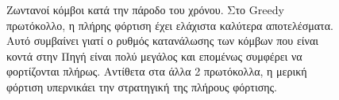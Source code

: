 \begin{figure}[H]
  \centering
  \caption{Ζωντανοί κόμβοι κατά την πάροδο του χρόνου. Στο Greedy πρωτόκολλο, η πλήρης φόρτιση έχει ελάχιστα καλύτερα αποτελέσματα. Αυτό συμβαίνει γιατί ο ρυθμός
κατανάλωσης των κόμβων που είναι κοντά στην Πηγή είναι πολύ μεγάλος και επομένως συμφέρει να φορτίζονται πλήρως. Αντίθετα στα άλλα 2 πρωτόκολλα, η μερική φόρτιση
υπερνικάει την στρατηγική της πλήρους φόρτισης.}
  \label{fig:2exp_1_1}
\end{figure}

